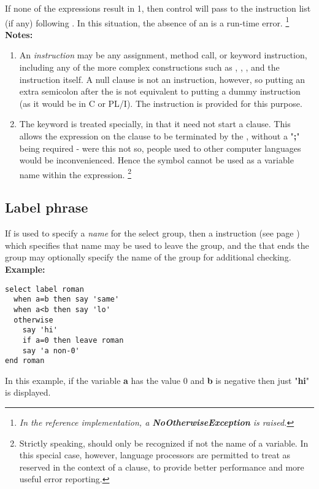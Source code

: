 If none of the  expressions result in 1, then control will
pass to the instruction list (if any) following .
In this situation, the absence of an  is a run-time
error.
\footnote{
\emph{In the reference implementation, a \textbf{NoOtherwiseException}
is raised.}
}
 \textbf{Notes:}
\begin{enumerate}
\item An \emph{instruction} may be any assignment, method call, or keyword
instruction, including any of the more complex constructions such as
, , , and the 
instruction itself.
A null clause is not an instruction, however, so putting an extra
semicolon after the  is not equivalent to putting a dummy
instruction (as it would be in C or PL/I).
The  instruction is provided for this purpose.
\item The keyword  is treated specially, in that it need not
start a clause.
This allows the expression on the  clause to be terminated
by the , without a "\textbf{;}" being required
- were this not so, people used to other computer languages would
be inconvenienced.
Hence the symbol  cannot be used as a variable name within
the expression.
\footnote{
Strictly speaking,  should only be recognized if not
the name of a variable.  In this special case, however, \nr{} language
processors are permitted to treat  as reserved in the
context of a  clause, to provide better performance and
more useful error reporting.
}
\end{enumerate}
\subsection{Label phrase}
 
If  is used to specify a \emph{name} for the select
group, then a   instruction (see page \pageref{refleave})  which
specifies that name may be used to leave the group, and the 
that ends the group may optionally specify the name of the group for
additional checking.
 \textbf{Example:}
\begin{lstlisting}
select label roman
  when a=b then say 'same'
  when a<b then say 'lo'
  otherwise
    say 'hi'
    if a=0 then leave roman
    say 'a non-0'
end roman
\end{lstlisting}
In this example, if the variable \textbf{a} has the value 0
and \textbf{b} is negative then just "\textbf{hi}" is
displayed.
